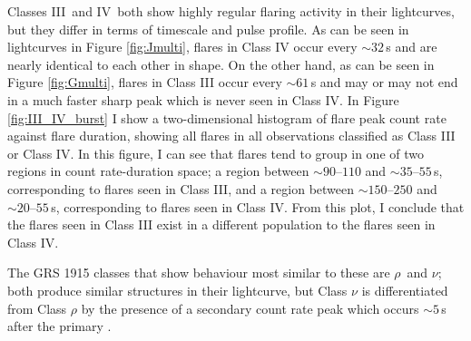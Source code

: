 \par Classes III\indexiii\ and IV\indexiv\ both show highly regular flaring activity in their lightcurves, but they differ in terms of timescale and pulse profile.  As can be seen in lightcurves in Figure \ref{fig:Jmulti}, flares in Class IV occur every $\sim32$\,s and are nearly identical to each other in shape.  On the other hand, as can be seen in Figure \ref{fig:Gmulti}, flares in Class III occur every $\sim61$\,s and may or may not end in a much faster sharp peak which is never seen in Class IV.  In Figure \ref{fig:III_IV_burst} I show a two-dimensional histogram of flare peak count rate against flare duration, showing all flares in all observations classified as Class III or Class IV.  In this figure, I can see that flares tend to group in one of two regions in count rate-duration space; a region between $\sim90\mbox{--}110$ \spcu and $\sim35\mbox{--}55$\,s, corresponding to flares seen in Class III, and a region between $\sim150\mbox{--}250$ \spcu and $\sim20\mbox{--}55$\,s, corresponding to flares seen in Class IV.  From this plot, I conclude that the flares seen in Class III exist in a different population to the flares seen in Class IV.
\par The GRS 1915 classes that show behaviour most similar to these are $\rho$\indexrho\ and $\nu$\indexnu; both produce similar structures in their lightcurve, but Class $\nu$ is differentiated from Class $\rho$ by the presence of a secondary count rate peak which occurs $\sim5$\,s after the primary \citep{Belloni_GRS_MI}.

